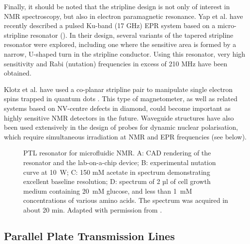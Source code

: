Finally, it should be noted that the
stripline design is not only of interest in NMR spectroscopy, but also
in electron paramagnetic resonance. Yap et al. have recently described a
pulsed Ku-band (17 GHz) EPR system based on a micro-stripline resonator ().
In their design, several variants of the tapered stripline resonator
were explored, including one where the sensitive area is formed by a
narrow, U-shaped turn in the stripline conductor. Using this resonator,
very high sensitivity and Rabi (nutation) frequencies in excess of 210
MHz have been obtained. 

Klotz et al. have used a co-planar stripline
pair to manipulate single electron spins trapped in quantum dots
\cite{Klotz:2011gf}. This type of magnetometer, as well as related systems
based on NV-centre defects in diamond, could become
important as highly sensitive NMR detectors in the future. Waveguide
structures have also been used extensively in the design of probes for
dynamic nuclear polarisation, which require simultaneous irradiation at
NMR and EPR frequencies (see below).


\begin{figure}
	\begin{center}
	\end{center}
	\caption{PTL resonator for microfluidic NMR. A: CAD rendering of the resonator and the lab-on-a-chip device; B: experimental nutation curve at 10~W; C: 150 mM acetate in  spectrum demonstrating excellent baseline resolution; D:  spectrum of 2 µl of cell growth medium containing 20~mM glucose, and less than 1~mM concentrations of various amino acids. The spectrum was acquired in about 20 min. Adapted with permission from \cite{Finch:2016gv}.}
	\label{fig-Finch-2016gv}
\end{figure}


\subsection{Parallel Plate Transmission Lines}\label{parallel-plate-transmission-lines}

